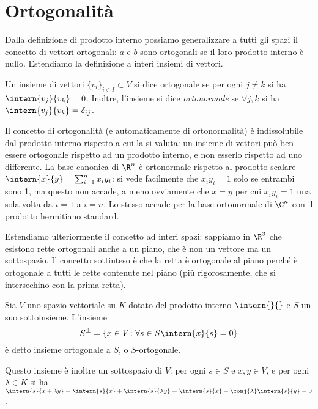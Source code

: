 \section{Ortogonalità} \label{sec:ortogonalita}
Dalla definizione di prodotto interno possiamo generalizzare a tutti gli spazi il concetto di vettori ortogonali: $  a$ e $  b$ sono ortogonali se il loro prodotto interno è nullo.
Estendiamo la definizione a interi insiemi di vettori.
\begin{definizione} \label{d:insieme-ortogonale}
	Un insieme di vettori $\{  v_i\}_{i\in I}\subset V$ si dice ortogonale se per ogni $j\neq k$ si ha $\intern{  v_j}{  v_k}=0$.
	Inoltre, l'insieme si dice \emph{ortonormale} se $\forall j,k$ si ha $\intern{  v_j}{  v_k}=\delta_{ij}$.
\end{definizione}
Il concetto di ortogonalità (e automaticamente di ortonormalità) è indissolubile dal prodotto interno rispetto a cui la si valuta: un insieme di vettori può ben essere ortogonale rispetto ad un prodotto interno, e non esserlo rispetto ad uno differente. 
La base canonica di $\R^n$ è ortonormale rispetto al prodotto scalare $\intern{  x}{  y}=\sum_{i=1}^nx_iy_i$: si vede facilmente che $x_iy_i=1$ solo se entrambi sono 1, ma questo non accade, a meno ovviamente che $  x=  y$ per cui $x_iy_i=1$ una sola volta da $i=1$ a $i=n$.
Lo stesso accade per la base ortonormale di $\C^n$ con il prodotto hermitiano standard.

Estendiamo ulteriormente il concetto ad interi spazi: sappiamo in $\R^3$ che esistono rette ortogonali anche a un piano, che è non un vettore ma un sottospazio.
Il concetto sottinteso è che la retta è ortogonale al piano perché è ortogonale a tutti le rette contenute nel piano (più rigorosamente, che si intersechino con la prima retta).
\begin{definizione} \label{d:spazio-ortogonale}
	Sia $V$ uno spazio vettoriale su $K$ dotato del prodotto interno $\intern{}{}$ e $S$ un suo sottoinsieme. L'insieme
	\begin{equation*}
		S^\perp=\{  x\in V\colon\forall  s\in S\intern{  x}{  s}=0\}
	\end{equation*}
	è detto insieme ortogonale a $S$, o $S$-ortogonale.
\end{definizione}
Questo insieme è inoltre un sottospazio di $V$: per ogni $  s\in S$ e $  x,  y\in V$, e per ogni $\lambda\in K$ si ha $\intern{  s}{  x+\lambda  y}=\intern{  s}{  x}+\intern{  s}{\lambda  y}=\intern{  s}{  x}+\conj{\lambda}\intern{  s}{  y}=0$.

